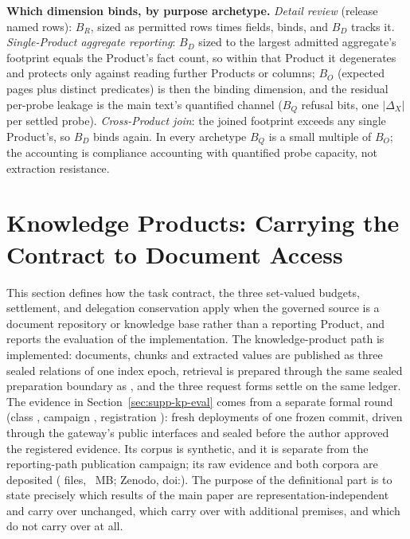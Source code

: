 \documentclass[journal,onecolumn]{IEEEtran}
\newcommand{\code}[1]{\texttt{\detokenize{#1}}}
\begin{document}
\textbf{Which dimension binds, by purpose archetype.}
\emph{Detail review} (release named rows): $B_R$, sized as permitted rows
times fields, binds, and $B_D$ tracks it. \emph{Single-Product aggregate
reporting}: $B_D$ sized to the largest admitted aggregate's footprint equals
the Product's fact count, so within that Product it degenerates and protects
only against reading further Products or columns; $B_O$ (expected pages plus
distinct predicates) is then the binding dimension, and the residual
per-probe leakage is the main text's quantified channel ($B_Q$ refusal bits,
one $|\Delta_X|$ per settled probe). \emph{Cross-Product join}: the joined
footprint exceeds any single Product's, so $B_D$ binds again. In every
archetype $B_Q$ is a small multiple of $B_O$; the accounting is compliance
accounting with quantified probe capacity, not extraction resistance.

\section{Knowledge Products: Carrying the Contract to Document Access}
\label{sec:supp-knowledge-products}

This section defines how the task contract, the three set-valued budgets,
settlement, and delegation conservation apply when the governed source is a
document repository or knowledge base rather than a reporting Product, and
reports the evaluation of the implementation. The knowledge-product
path is implemented: documents, chunks and extracted values are published as
three sealed relations of one index epoch, retrieval is prepared through the
same sealed preparation boundary as \code{execute_plan}, and the three
request forms settle on the same ledger. The evidence in
Section~\ref{sec:supp-kp-eval} comes from a separate formal round (class
\texttt{\KbEvidenceClass}, campaign \texttt{\KbFormalCampaign}, registration
\KbFormalRegistrationDigest): fresh deployments of one frozen commit, driven
through the gateway's public interfaces and sealed before the author approved
the registered evidence. Its corpus is synthetic, and it is separate from the
reporting-path publication campaign; its raw evidence and both corpora are
deposited (\KbRawEvidenceFiles{} files, \KbRawEvidenceMB{}~MB; Zenodo,
doi:\KbRawEvidenceDOI{}). The purpose
of the definitional part is to state precisely which results of the main
paper are representation-independent and carry over unchanged, which carry
over with additional premises, and which do not carry over at all.
\end{document}
